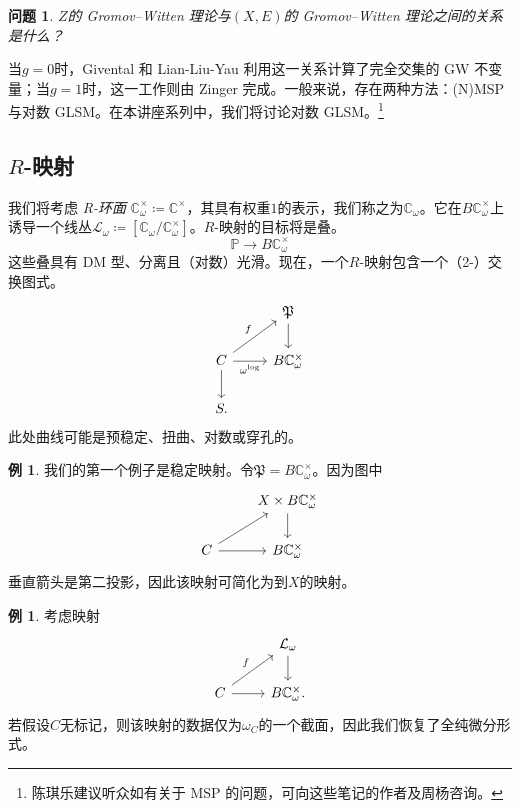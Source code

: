\documentclass{amsart}
\newtheorem{quest}[thm]{问题}
\theoremstyle{definition}
\newtheorem{exm}[thm]{例}
\theoremstyle{remark}
\theoremstyle{plain}
\theoremstyle{definition}
\theoremstyle{remark}
\newcommand{\C}{\mathbb{C}}
\renewcommand{\P}{\mathbb{P}}
\newcommand{\mc}[1]{\mathcal{#1}}
\newcommand{\mf}[1]{\mathfrak{#1}}
\newcommand{\1}{\mathbf{1}}
\newcommand{\2}{\mathbf{2}}
\newcommand{\3}{\mathbf{3}}
\begin{document}
\begin{quest}
\(Z\)的 Gromov--Witten 理论与\((X, E)\)的 Gromov--Witten 理论之间的关系是什么？
\end{quest}

当\(g = 0\)时，Givental 和 Lian-Liu-Yau 利用这一关系计算了完全交集的 GW 不变量；当\(g = 1\)时，这一工作则由 Zinger 完成。一般来说，存在两种方法：(N)MSP 与对数 GLSM。在本讲座系列中，我们将讨论对数 GLSM。\footnote{陈琪乐建议听众如有关于 MSP 的问题，可向这些笔记的作者及周杨咨询。}

\subsection{\(R\)-映射}%
\label{sub:R-maps}

我们将考虑 \textit{R-环面} \(\C^{\times}_{\omega} \coloneqq \C^{\times}\)，其具有权重\(1\)的表示，我们称之为\(\C_{\omega}\)。它在\(B \C_{\omega}^{\times}\)上诱导一个线丛\(\mc{L}_{\omega} \coloneqq [\C_{\omega} / \C^{\times}_{\omega}]\)。\(R\)-映射的目标将是叠。
\[ \P \to B \C^{\times}_{\omega} \]
这些叠具有 DM 型、分离且（对数）光滑。现在，一个\(R\)-映射包含一个（2-）交换图式。
\begin{equation*}
\begin{tikzcd}
    & \mf{P} \ar{d} \\
    C \ar{ur}{f} \ar{r}[swap]{\omega^{\log}} \ar{d} & B \C_{\omega}^{\times} \\
    S.
\end{tikzcd}
\end{equation*}
此处曲线可能是预稳定、扭曲、对数或穿孔的。

\begin{exm}
我们的第一个例子是稳定映射。令\(\mf{P} = B\C_{\omega}^{\times}\)。因为图中
    \begin{equation*}
    \begin{tikzcd}
        & X \times B\C_{\omega}^{\times} \ar{d} \\
        C \ar{ur} \ar{r} & B \C_{\omega}^{\times}
    \end{tikzcd}
    \end{equation*}
垂直箭头是第二投影，因此该映射可简化为到\(X\)的映射。
\end{exm}

\begin{exm}
考虑映射
    \begin{equation*}
    \begin{tikzcd}
        & \mc{L}_{\omega} \ar{d} \\
        C \ar{ur}{f} \ar{r} & B \C_{\omega}^{\times}.
    \end{tikzcd}
    \end{equation*}
若假设\(C\)无标记，则该映射的数据仅为\(\omega_C\)的一个截面，因此我们恢复了全纯微分形式。
\end{exm}
\end{document}
